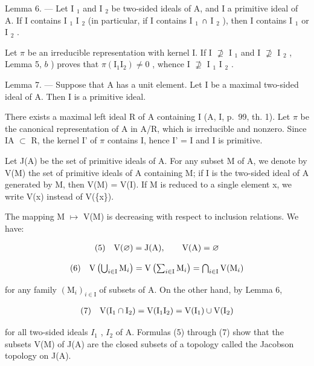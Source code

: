 Lemma 6. --- Let I \(_{1}\) and I \(_{2}\) be two-sided ideals of A, and I a primitive ideal of A. If I contains I \(_{1}\) I \(_{2}\) (in particular, if I contains I \(_{1}\) ∩ I \(_{2}\) ), then I contains I \(_{1}\) or I \(_{2}\) .

Let \(\pi\) be an irreducible representation with kernel I. If I \(\not\supseteq\) I \(_1\) and I \(\not\supseteq\) I \(_2\) , Lemma 5, \(b\) ) proves that \(\pi(\text{I}_1\text{I}_2) \neq 0\) , whence I \(\not\supseteq\) I \(_1\) I \(_2\) .

Lemma 7. --- Suppose that A has a unit element. Let I be a maximal two-sided ideal of A. Then I is a primitive ideal.

There exists a maximal left ideal R of A containing I (A, I, p.~99, th. 1). Let \(\pi\) be the canonical representation of A in A/R, which is irreducible and nonzero. Since IA \(\subset\) R, the kernel I' of \(\pi\) contains I, hence I' = I and I is primitive.

Let J(A) be the set of primitive ideals of A. For any subset M of A, we denote by V(M) the set of primitive ideals of A containing M; if I is the two-sided ideal of A generated by M, then V(M) = V(I). If M is reduced to a single element x, we write V(x) instead of V(\{x\}).

The mapping M \(\mapsto\) V(M) is decreasing with respect to inclusion relations. We have:

\[
\begin{array}{r l} (5) & \mathrm{V} (\varnothing) = \mathrm{J} (\mathrm{A}), \qquad \mathrm{V} (\mathrm{A}) = \varnothing \end{array}
\]

\[
\begin{array}{r l} (6) & \mathrm{V} \left(\bigcup_ {i \in \mathrm{I}} \mathrm{M} _ {i}\right) = \mathrm{V} \left(\sum_ {i \in \mathrm{I}} \mathrm{M} _ {i}\right) = \bigcap_ {i \in \mathrm{I}} \mathrm{V} (\mathrm{M} _ {i}) \end{array}
\]

for any family \((\mathrm{M}_{i})_{i\in\mathrm{I}}\) of subsets of A. On the other hand, by Lemma 6,

\[
\begin{array}{r l} (7) & \mathrm{V} (\mathrm{I} _ {1} \cap \mathrm{I} _ {2}) = \mathrm{V} (\mathrm{I} _ {1} \mathrm{I} _ {2}) = \mathrm{V} (\mathrm{I} _ {1}) \cup \mathrm{V} (\mathrm{I} _ {2}) \end{array}
\]

for all two-sided ideals \(I_{1}\) , \(I_{2}\) of A. Formulas (5) through (7) show that the subsets V(M) of J(A) are the closed subsets of a topology called the Jacobson topology on J(A).

